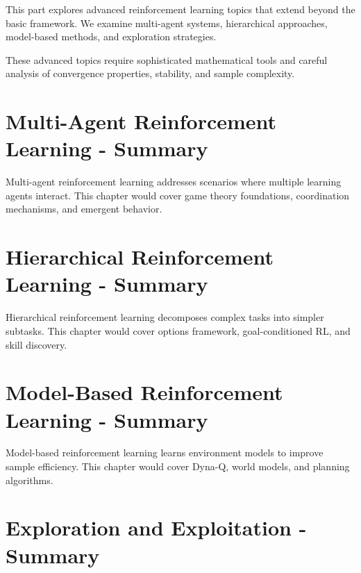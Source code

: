 \documentclass[11pt,twoside,openright]{book}
\begin{document}
This part explores advanced reinforcement learning topics that extend beyond the basic framework. We examine multi-agent systems, hierarchical approaches, model-based methods, and exploration strategies.

These advanced topics require sophisticated mathematical tools and careful analysis of convergence properties, stability, and sample complexity.

\chapter{Multi-Agent Reinforcement Learning - Summary}
\label{ch:multi-agent-summary}

\begin{keyideabox}
Multi-agent reinforcement learning addresses scenarios where multiple learning agents interact. This chapter would cover game theory foundations, coordination mechanisms, and emergent behavior.
\end{keyideabox}

\chapter{Hierarchical Reinforcement Learning - Summary}
\label{ch:hierarchical-summary}

\begin{keyideabox}
Hierarchical reinforcement learning decomposes complex tasks into simpler subtasks. This chapter would cover options framework, goal-conditioned RL, and skill discovery.
\end{keyideabox}

\chapter{Model-Based Reinforcement Learning - Summary}
\label{ch:model-based-summary}

\begin{keyideabox}
Model-based reinforcement learning learns environment models to improve sample efficiency. This chapter would cover Dyna-Q, world models, and planning algorithms.
\end{keyideabox}

\chapter{Exploration and Exploitation - Summary}
\label{ch:exploration-summary}
\end{document}
